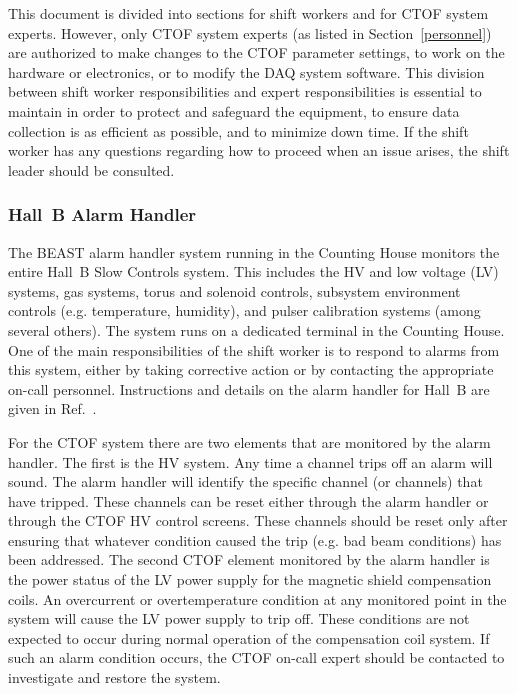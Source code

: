 \documentclass[12pt]{article}
\begin{document}
This document is divided into sections for shift workers and for CTOF system 
experts. However, only CTOF system experts (as listed in Section~\ref{personnel}) 
are authorized to make changes to the CTOF parameter settings, to work on the 
hardware or electronics, or to modify the DAQ system software. This division 
between shift worker responsibilities and expert responsibilities is essential
to maintain in order to protect and safeguard the equipment, to ensure data 
collection is as efficient as possible, and to minimize down time. If the shift 
worker has any questions regarding how to proceed when an issue arises, the shift 
leader should be consulted.

\subsubsection{Hall~B Alarm Handler}
\label{alarms}

The BEAST alarm handler system running in the Counting House monitors the entire 
Hall~B Slow Controls system. This includes the HV and low voltage (LV) systems, 
gas systems, torus and solenoid controls, subsystem environment controls (e.g. 
temperature, humidity), and pulser calibration systems (among several others). The 
system runs on a dedicated terminal in the Counting House. One of the main 
responsibilities of the shift worker is to respond to alarms from this system, 
either by taking corrective action or by contacting the appropriate on-call personnel. 
Instructions and details on the alarm handler for Hall~B are given in Ref.~\cite{beast}.

For the CTOF system there are two elements that are monitored by the alarm handler. 
The first is the HV system. Any time a channel trips off an alarm will sound. The 
alarm handler will identify the specific channel (or channels) that have tripped. 
These channels can be reset either through the alarm handler or through the CTOF HV 
control screens. These channels should be reset only after ensuring that whatever 
condition caused the trip (e.g. bad beam conditions) has been addressed. The second 
CTOF element monitored by the alarm handler is the power status of the LV power 
supply for the magnetic shield compensation coils. An overcurrent or overtemperature 
condition at any monitored point in the system will cause the LV power supply to trip 
off. These conditions are not expected to occur during normal operation of the 
compensation coil system. If such an alarm condition occurs, the CTOF on-call expert 
should be contacted to investigate and restore the system.
\end{document}
